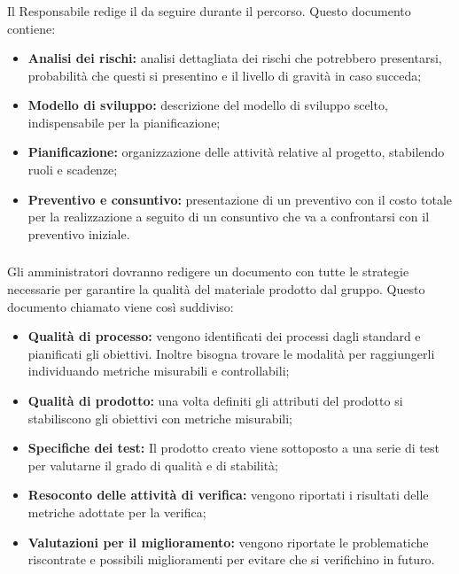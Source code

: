 \subsubsection{\PdP}
Il Responsabile redige il \PdPv{}da seguire durante il percorso. Questo documento contiene:
\begin{itemize}
    \item \textbf{Analisi dei rischi:} analisi dettagliata dei rischi che potrebbero presentarsi, probabilità che questi si presentino e il livello di gravità in caso succeda;
    \item \textbf{Modello di sviluppo:} descrizione del modello di sviluppo scelto, indispensabile per la pianificazione;
    \item \textbf{Pianificazione:} organizzazione delle attività relative al progetto, stabilendo ruoli e scadenze;
    \item \textbf{Preventivo e consuntivo:} presentazione di un preventivo con il costo totale per la realizzazione a seguito di un consuntivo che va a confrontarsi con il preventivo iniziale.
\end{itemize}

\subsubsection{\PdQ}
Gli amministratori dovranno redigere un documento con tutte le strategie necessarie per garantire la qualità del materiale prodotto dal gruppo. Questo documento chiamato \PdQv{}viene così suddiviso:
\begin{itemize}
    \item \textbf{Qualità di processo:} vengono identificati dei processi dagli standard e pianificati gli obiettivi. Inoltre bisogna trovare le modalità per raggiungerli individuando metriche misurabili e controllabili;    
    \item \textbf{Qualità di prodotto:} una volta definiti gli attributi del prodotto si stabiliscono gli obiettivi con metriche misurabili;    
     \item \textbf{Specifiche dei test:} Il prodotto creato viene sottoposto a una serie di test per valutarne il grado di qualità e di stabilità;
     \item \textbf{Resoconto delle attività di verifica:} vengono riportati i risultati delle metriche adottate per la verifica;
    \item \textbf{Valutazioni per il miglioramento:} vengono riportate le problematiche riscontrate e possibili miglioramenti per evitare che si verifichino in futuro.
\end{itemize}

